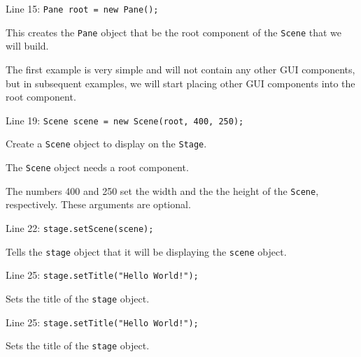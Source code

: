 \documentclass{beamer}
\newcommand{\mil}[1]{\texttt{#1}}
\begin{document}
\begin{frame}[fragile]

    Line 15:  \mil{Pane root = new Pane();}

    \bigskip
    
    This creates the \mil{Pane} object that be the root component of the \mil{Scene} that we will build.
    
    \bigskip
    
    The first example is very simple and will not contain any other GUI components, but in subsequent examples, we will start placing other GUI components into the root component.
    
\end{frame}

\begin{frame}[fragile]

    Line 19:  \mil{Scene scene = new Scene(root, 400, 250);}
    
    \bigskip
    
    Create a \mil{Scene} object to display on the \mil{Stage}.
    
    \bigskip
    
    The \mil{Scene} object needs a root component.
    
    \bigskip
    
    The numbers 400 and 250 set the width and the the height of the \mil{Scene}, respectively.  These arguments are optional.

\end{frame}

\begin{frame}[fragile]

    Line 22:  \mil{stage.setScene(scene);}
    
    \bigskip

    Tells the \mil{stage} object that it will be displaying the \mil{scene} object.    

\end{frame}

\begin{frame}[fragile]

    Line 25:  \mil{stage.setTitle("Hello World!");}
    
    \bigskip
    
    Sets the title of the \mil{stage} object.
    
\end{frame}

\begin{frame}[fragile]

    Line 25:  \mil{stage.setTitle("Hello World!");}
    
    \bigskip
    
    Sets the title of the \mil{stage} object.

\end{frame}
\end{document}
